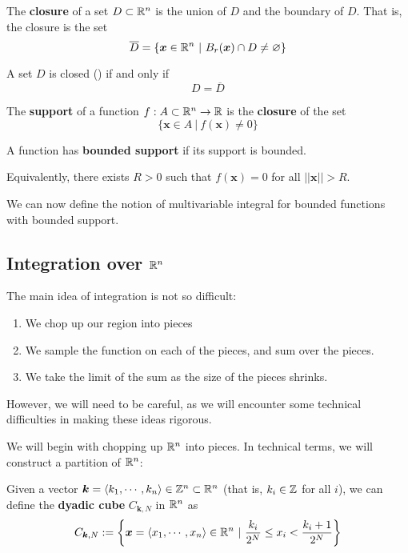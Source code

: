     \begin{definition}
    The \textbf{closure} of a set $D \subset \mathbb{R}^n$ is the union of $D$ and the boundary of $D$.  That is, the closure is the set $$\overline{D} = \{\bm{x} \in \R^n \ | \ B_r(\bm{x}) \cap D \neq \varnothing\}$$  
    \end{definition}

\begin{proposition}
    A set $D$ is closed () if and only if $$D = \overline{D}$$
\end{proposition}

\begin{definition}
    The \textbf{support} of a function $f : A \subset \mathbb{R}^n \to \mathbb{R}$ is the \textbf{closure} of the set $$\{\bm{x} \in A \ | \ f(\bm{x}) \neq 0\}$$
\end{definition}

\begin{definition}
    A function has \textbf{bounded support} if its support is bounded.  

    Equivalently, there exists $R>0$ such that $f(\bm{x}) = 0$ for all $||\bm{x}|| > R$.
    \end{definition}

We can now define the notion of multivariable integral for bounded functions with bounded support.  


\subsection{Integration over $\mathbb{R}^n$}

The main idea of integration is not so difficult: 

\begin{enumerate}
    \item We chop up our region into pieces
    \item We sample the function on each of the pieces, and sum over the pieces.
    \item We take the limit of the sum as the size of the pieces shrinks.
\end{enumerate}

However, we will need to be careful, as we will encounter some technical difficulties in making these ideas rigorous.

We will begin with chopping up $\mathbb{R}^n$ into pieces.  In technical terms, we will construct a partition of $\mathbb{R}^n$:

\begin{definition}
    Given a vector $\bm{k} = \langle k_1, \cdots, k_n\rangle \in \mathbb{Z}^n \subset \mathbb{R}^n$ (that is, $k_i \in \mathbb{Z}$ for all $i$), we can define the \textbf{dyadic cube} $C_{\bm{k},N}$ in $\mathbb{R}^n$ as
    $$C_{\bm{k},N} := \left\{ \bm{x} = \langle x_1, \cdots, x_n\rangle \in \mathbb{R}^n \ | \ \frac{k_i}{2^N} \leq x_i < \frac{k_i+1}{2^N}\right\}$$

    
    \end{definition}

